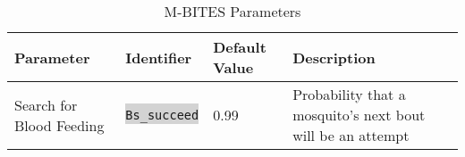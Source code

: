 \documentclass{article}
\newcommand{\inlinecode}[2]{\colorbox{lightgray}{\lstinline[language=#1]$#2$}}
\begin{document}
\begin{table}[h!]
  \begin{center}
    \caption{M-BITES Parameters}
    \label{tab:table1}
    \begin{tabular}{l | l | l | p{5cm}} %
      \textbf{Parameter} & \textbf{Identifier} & \textbf{Default Value} & \textbf{Description}\\
      \hline
      Search for Blood Feeding & \inlinecode{R}{Bs_succeed} & 0.99 & Probability that a mosquito's next bout will be an attempt \\
    \end{tabular}
  \end{center}
\end{table}
\end{document}
